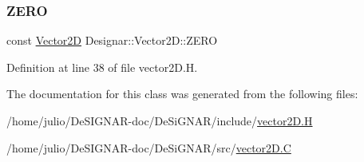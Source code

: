 \subsubsection{\texorpdfstring{Z\+E\+RO}{ZERO}}
{\footnotesize\ttfamily const \hyperlink{class_designar_1_1_vector2_d}{Vector2D} Designar\+::\+Vector2\+D\+::\+Z\+E\+RO\hspace{0.3cm}{\ttfamily [static]}}



Definition at line 38 of file vector2\+D.\+H.



The documentation for this class was generated from the following files\+:\begin{DoxyCompactItemize}
\item 
/home/julio/\+De\+S\+I\+G\+N\+A\+R-\/doc/\+De\+Si\+G\+N\+A\+R/include/\hyperlink{vector2_d_8_h}{vector2\+D.\+H}\item 
/home/julio/\+De\+S\+I\+G\+N\+A\+R-\/doc/\+De\+Si\+G\+N\+A\+R/src/\hyperlink{vector2_d_8_c}{vector2\+D.\+C}\end{DoxyCompactItemize}
